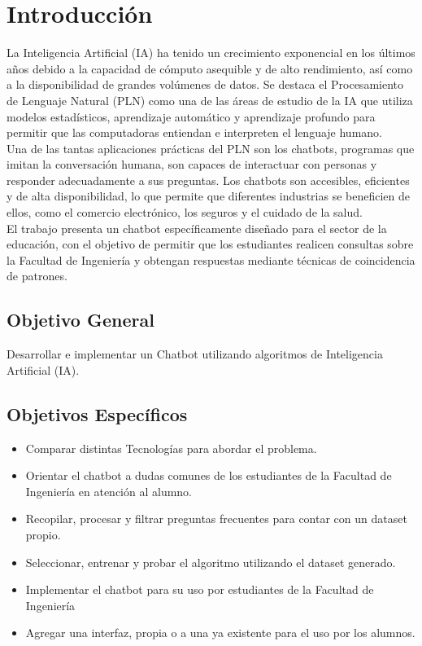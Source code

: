 \section{Introducción}
La Inteligencia Artificial (IA) ha tenido un crecimiento exponencial en los últimos años debido a
la capacidad de cómputo asequible y de alto rendimiento, así como a la disponibilidad de grandes
volúmenes de datos. Se destaca el Procesamiento de Lenguaje Natural (PLN) como una de las áreas de
estudio de la IA que utiliza modelos estadísticos, aprendizaje automático y aprendizaje profundo
para permitir que las computadoras entiendan e interpreten el lenguaje humano.\\
\indent Una de las tantas aplicaciones prácticas del PLN son los chatbots, programas que imitan la
conversación humana, son capaces de interactuar con personas y responder adecuadamente a sus
preguntas. Los chatbots son accesibles, eficientes y de alta disponibilidad, lo que permite que
diferentes industrias se beneficien de ellos, como el comercio electrónico, los seguros y el
cuidado de la salud.\\
\indent El trabajo presenta un chatbot específicamente diseñado para el sector de la educación, con
el objetivo de permitir que los estudiantes realicen consultas sobre la Facultad de Ingeniería y
obtengan respuestas mediante técnicas de coincidencia de patrones.

\subsection{Objetivo General}

Desarrollar e implementar un Chatbot utilizando algoritmos de Inteligencia Artificial (IA).

\subsection{Objetivos Específicos}
\begin{itemize}
	\item Comparar distintas Tecnologías para abordar el problema.
	\item Orientar el chatbot a dudas comunes de los estudiantes de la Facultad de Ingeniería en
	      atención al alumno.
	\item Recopilar, procesar y filtrar preguntas frecuentes para contar con un dataset
	      propio.
	\item Seleccionar, entrenar y probar el algoritmo utilizando el dataset generado.
	\item Implementar el chatbot para su uso por estudiantes de la Facultad de Ingeniería
	\item Agregar una interfaz, propia o a una ya existente para el uso por los alumnos.

\end{itemize}

